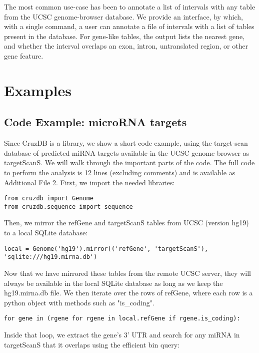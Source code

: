 \documentclass[10pt]{bmc_article}
\newenvironment{bmcformat}{\baselineskip20pt\sloppy\setboolean{publ}{false}}{\baselineskip20pt\sloppy}
\begin{document}
\begin{bmcformat}
The most common use-case has been to annotate a list of intervals with any table from the UCSC genome-browser database. We provide an interface, by which, with a single command, a user can annotate a file of intervals with a list of tables present in the database. For gene-like tables, the output lists the nearest gene, and whether the interval overlaps an exon, intron, untranslated region, or other gene feature.

\section*{Examples}


\subsection*{Code Example: microRNA targets}

Since CruzDB is a library, we show a short code example, using the target-scan database of predicted miRNA targets \cite{Grimson} available in the UCSC genome browser as targetScanS. We will walk through the important parts of the code. The full code to perform the analysis is 12 lines (excluding comments) and is available as Additional File 2. First, we import the needed libraries:

\begin{verbatim}
from cruzdb import Genome
from cruzdb.sequence import sequence
\end{verbatim}

Then, we mirror the refGene and targetScanS tables from UCSC (version hg19) to a local SQLite database:

\begin{verbatim}
local = Genome('hg19').mirror(('refGene', 'targetScanS'), 'sqlite:///hg19.mirna.db')
\end{verbatim}

Now that we have mirrored these tables from the remote UCSC server, they will always be available in the local SQLite database as long as we keep the hg19.mirna.db file. We then iterate over the rows of refGene, where each row is a python object with methods such as "is\_coding".

\begin{verbatim}
for gene in (rgene for rgene in local.refGene if rgene.is_coding):
\end{verbatim}

Inside that loop, we extract the gene’s 3’ UTR and search for any miRNA in targetScanS that it overlaps using the efficient bin query:


\end{bmcformat}
\end{document}

